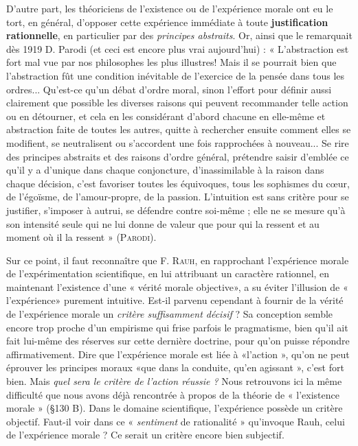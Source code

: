 D’autre part, les théoriciens de l'existence ou de l'expérience
morale ont eu le tort, en général, d’opposer cette expérience immédiate
à toute {\bf justification rationnelle}, en particulier par des {\it principes
abstraits}. Or, ainsi que le remarquait dès 1919 D. Parodi
(et ceci est encore plus vrai aujourd’hui) : « L’abstraction est fort
mal vue par nos philosophes les plus illustres! Mais il se pourrait
bien que l’abstraction fût une condition inévitable de l'exercice de
la pensée dans tous les ordres... Qu'est-ce qu’un débat d’ordre moral,
sinon l'effort pour définir aussi clairement que possible les diverses
raisons qui peuvent recommander telle action ou en détourner, et
cela en les considérant d’abord chacune en elle-même et abstraction
faite de toutes les autres, quitte à rechercher ensuite comment elles
se modifient, se neutralisent ou s’accordent une fois rapprochées à
nouveau... Se rire des principes abstraits et des raisons d’ordre général,
prétendre saisir d'emblée ce qu’il y a d’unique dans chaque conjoncture,
d’inassimilable à la raison dans chaque décision, c’est favoriser
toutes les équivoques, tous les sophismes du cœur, de l’égoïsme,
de l’amour-propre, de la passion. L’intuition est sans critère pour se
justifier, s’imposer à autrui, se défendre contre soi-même ; elle ne se
mesure qu’à son intensité seule qui ne lui donne de valeur que pour
qui la ressent et au moment où il la ressent » (\textsc{Parodi}).

Sur ce point, il faut reconnaître que F. \textsc{Rauh}, en rapprochant
l’expérience morale de l’expérimentation scientifique, en lui attribuant
un caractère rationnel, en maintenant l'existence d’une « vérité
morale objective», a su éviter l’illusion de « l’expérience» purement
intuitive. Est-il parvenu cependant à fournir de la vérité de l’expérience
morale un {\it critère suffisamment décisif} ? Sa conception semble
encore trop proche d’un empirisme qui frise parfois le pragmatisme,
bien qu'il ait fait lui-même des réserves sur cette dernière doctrine,
pour qu’on puisse répondre affirmativement. Dire que l’expérience
morale est liée à «l’action », qu’on ne peut éprouver les principes
moraux «que dans la conduite, qu’en agissant », c’est fort bien.
Mais {\it quel sera le critère de l’action réussie ?} Nous retrouvons ici la
même difficulté que nous avons déjà rencontrée à propos de la théorie
de « l’existence morale » (\S 130 B). Dans le domaine scientifique,
l'expérience possède un critère objectif. Faut-il voir dans ce « {\it sentiment}
de rationalité » qu’invoque Rauh, celui de l’expérience morale ?
Ce serait un critère encore bien subjectif.

